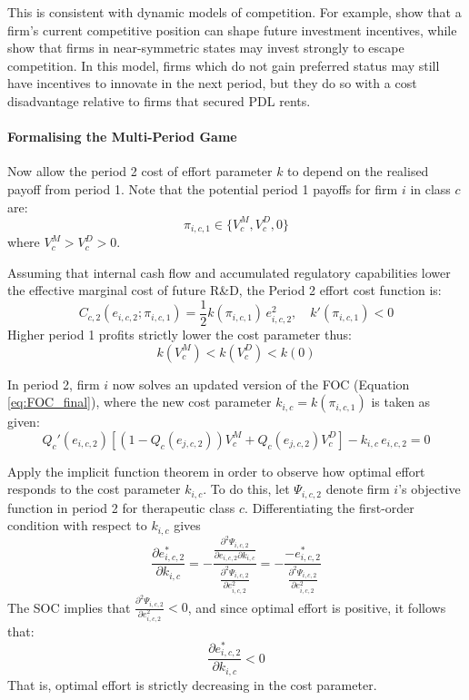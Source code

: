 \documentclass[12pt]{article}
\begin{document}
This is consistent with dynamic models of competition. For example, \cite{budd1993model} show that a firm's current competitive position can shape future investment incentives, while \cite{aghion2001competition} show that firms in near-symmetric states may invest strongly to escape competition. In this model, firms which do not gain preferred status may still have incentives to innovate in the next period, but they do so with a cost disadvantage relative to firms that secured PDL rents.

\paragraph{Formalising the Multi-Period Game} 
Now allow the period 2 cost of effort parameter $k$ to depend on the realised payoff from period 1. Note that the potential period 1 payoffs for firm $i$ in class $c$ are:
\begin{equation}
    \pi_{i,c,1} \in \{V_c^M, V_c^D, 0\}
\end{equation}
where $V_c^M > V_c^D > 0$. 

Assuming that internal cash flow and accumulated regulatory capabilities lower the effective marginal cost of future R\&D, the Period 2 effort cost function is:
\begin{equation}
    C_{c,2}(e_{i,c,2} ; \pi_{i,c,1}) = \frac{1}{2} k(\pi_{i,c,1}) \, e_{i,c,2}^2, \quad k'(\pi_{i,c,1}) < 0
\end{equation}
Higher period 1 profits strictly lower the cost parameter thus:
\begin{equation}
    k(V_c^M) < k(V_c^D) < k(0)
\end{equation}

In period 2, firm $i$ now solves an updated version of the FOC (Equation \ref{eq:FOC_final}), where the new cost parameter $k_{i,c} = k(\pi_{i,c,1})$ is taken as given:
\begin{equation} \label{eq:FOC_period2}
    Q_c'(e_{i,c,2}) \left[ (1-Q_c(e_{j,c,2})) V_c^M + Q_c(e_{j,c,2}) V_c^D \right] - k_{i,c} \, e_{i,c,2} = 0
\end{equation}

Apply the implicit function theorem in order to observe how optimal effort responds to the cost parameter $k_{i,c}$. To do this, let $\Psi_{i,c,2}$ denote firm $i$'s objective function in period 2 for therapeutic class $c$. Differentiating the first-order condition with respect to $k_{i,c}$ gives
\begin{equation}
    \frac{\partial e_{i,c,2}^*}{\partial k_{i,c}} = - \frac{\frac{\partial^2 \Psi_{i,c,2}}{\partial e_{i,c,2} \partial k_{i,c}}}{\frac{\partial^2 \Psi_{i,c,2}}{\partial e_{i,c,2}^2}} = - \frac{-e_{i,c,2}^*}{\frac{\partial^2 \Psi_{i,c,2}}{\partial e_{i,c,2}^2}}
\end{equation}
The SOC implies that $\frac{\partial^2 \Psi_{i,c,2}}{\partial e_{i,c,2}^2} < 0$, and since optimal effort is positive, it follows that:
\begin{equation}
    \frac{\partial e_{i,c,2}^*}{\partial k_{i,c}} < 0
\end{equation}
That is, optimal effort is strictly decreasing in the cost parameter.
\end{document}
